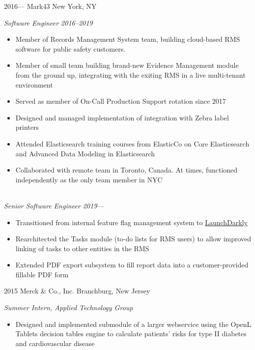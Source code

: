 \documentclass[]{friggeri-mlg-cv} %
\begin{document}
\begin{entrylist}
\entry
{2016---}
{Mark43}
{New York, NY}
{\emph{Software Engineer 2016--2019}\\
\begin{itemize}[leftmargin=*]
\item Member of Records Management System team, building cloud-based RMS software
for public safety customers.
\item Member of small team building brand-new Evidence Management module from the 
ground up, integrating with the exiting RMS in a live multi-tenant environment
\item Served as member of On-Call Production Support rotation since 2017
\item Designed and managed implementation of integration with Zebra label printers
\item Attended Elasticsearch training courses from ElasticCo on Core Elasticsearch
and Advanced Data Modeling in Elasticsearch
\item Collaborated with remote team in Toronto, Canada.  At times, functioned 
independently as the only team member in NYC
\end{itemize}
\quad\\
\emph{Senior Software Engineer 2019---}\\
\begin{itemize}[leftmargin=*]
\item Transitioned from internal feature flag management system to 
\href{https://launchdarkly.com}{LaunchDarkly}
\item Rearchitected the Tasks module (to-do lists for RMS users) to allow 
improved linking of tasks to other entities in the RMS
\item Extended PDF export subsystem to fill report data into a customer-provided
fillable PDF form
\end{itemize}}
\entry
{2015}
{Merck \& Co., Inc.}
{Branchburg, New Jersey}
{\emph{Summer Intern, Applied Technology Group}
\begin{itemize}[leftmargin=*]
\item Designed and implemented submodule of a larger webservice using the OpenL 
Tablets decision tables engine to calculate patients' risks for type II diabetes
and cardiovascular disease

\end{itemize}}
\end{entrylist}
\end{document}
